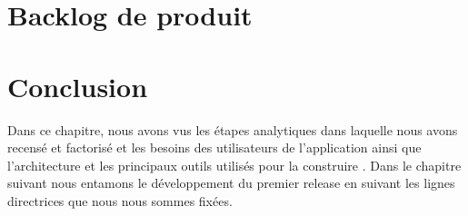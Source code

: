 \section{Backlog de produit}






\section{Conclusion}
Dans ce chapitre, nous avons vus les étapes analytiques dans laquelle nous avons recensé et
factorisé et les besoins des utilisateurs de l'application ainsi que l'architecture et les principaux
outils utilisés pour la construire . \newline
Dans le chapitre suivant nous entamons
le développement du premier release en suivant les lignes directrices que nous nous sommes
fixées.

